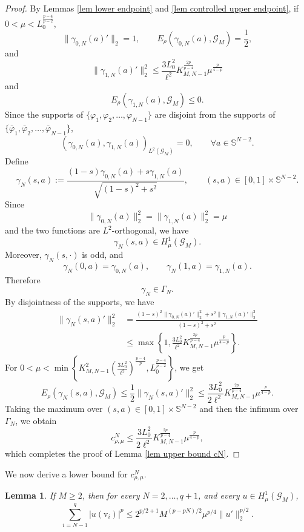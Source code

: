 \documentclass[11pt]{amsart}
\newtheorem{lemma}[theorem]{Lemma}
\newcommand{\norm}[1]{\lVert#1\rVert}
\newcommand{\G}{\mathcal{G}}
\newcommand{\vv}{\mathrm{v}}
\numberwithin{equation}{section}
\begin{document}
\begin{proof}
By Lemmas \ref{lem lower endpoint} and \ref{lem controlled upper endpoint}, if $0<\mu<L_0^{\frac{p-4}{p-2}}$,
$$
\|\gamma_{0,N}(a)'\|_2=1,
\qquad
E_\rho(\gamma_{0,N}(a),\G_M)=\frac12,
$$
and
$$
\|\gamma_{1,N}(a)'\|_2^2
\leq
\frac{3L_0^2}{\ell^2}
K^{\frac{2p}{p-4}}_{M,N-1}
\mu^\frac{p}{4-p}
$$
and
$$
E_\rho(\gamma_{1,N}(a),\G_M)\leq 0.
$$
Since the supports of $\{{\varphi}_{1},{\varphi}_{2},\ldots,{\varphi}_{N-1}\}$ are disjoint from the supports of $\{\bar{\varphi}_{1},\bar{\varphi}_{2},\ldots,\bar{\varphi}_{N-1}\}$,
$$
(\gamma_{0,N}(a),\gamma_{1,N}(a))_{L^2(\G_M)}=0,
\qquad 
\forall a\in\mathbb S^{N-2}.
$$
Define
$$
\gamma_N(s,a)
:=
\frac{(1-s)\gamma_{0,N}(a)+s\gamma_{1,N}(a)}
{\sqrt{(1-s)^2+s^2}},
\qquad
(s,a)\in[0,1]\times\mathbb S^{N-2}.
$$
Since
$$
\|\gamma_{0,N}(a)\|_2^2
=
\|\gamma_{1,N}(a)\|_2^2
=
\mu
$$
and the two functions are $L^2$-orthogonal, we have
$$
\gamma_N(s,a)\in H^1_\mu(\G_M).
$$
Moreover, $\gamma_N(s,\cdot)$ is odd, and
$$
\gamma_N(0,a)=\gamma_{0,N}(a),
\qquad
\gamma_N(1,a)=\gamma_{1,N}(a).
$$
Therefore
$$
\gamma_N\in\Gamma_N.
$$
By disjointness of the supports, we have
$$
\begin{aligned}
\|\gamma_N(s,a)'\|_2^2
&=
\frac{
(1-s)^2\|\gamma_{0,N}(a)'\|_2^2
+
s^2\|\gamma_{1,N}(a)'\|_2^2
}
{(1-s)^2+s^2}
\\
&\leq
\max\left\{
1,
\frac{3L_0^2}{\ell^2}K^{\frac{2p}{p-4}}_{M,N-1}
\mu^\frac{p}{4-p}
\right\}.
\end{aligned}
$$
For $0<\mu<\min\left\{K^{2}_{M,N-1}\left(\frac{3L_0^2}{\ell^2}\right)^\frac{p-4}{p},L_0^\frac{p-4}{p-2}\right\}$, we get
$$
E_\rho(\gamma_N(s,a),\G_M)
\leq
\frac12\|\gamma_N(s,a)'\|_2^2
\leq
\frac{3L_0^2}{2\ell^2}K^{\frac{2p}{p-4}}_{M,N-1}
\mu^\frac{p}{4-p}.
$$
Taking the maximum over $(s,a)\in[0,1]\times\mathbb S^{N-2}$ and then the
infimum over $\Gamma_N$, we obtain
$$
c_{\rho,\mu}^N
\leq
\frac{3L_0^2}{2\ell^2}K^{\frac{2p}{p-4}}_{M,N-1}
\mu^\frac{p}{4-p},
$$
which completes the proof of Lemma \ref{lem upper bound cN}.
\end{proof}
We now derive a lower bound for $c^N_{\rho,\mu}$.
\begin{lemma}\label{lem-trace-K}
If $M \geq 2$, then for every $N=2,\ldots,q+1$, and every
\(u\in H^1_\mu(\G_M)\),
\begin{equation}\label{trace-tail}
\sum_{i=N-1}^{q}|u(\vv_i)|^p\leq 2^{p/2+1}M^{(p-pN)/2}\mu^{p/4}\norm{u'}_2^{p/2}.
\end{equation}


\end{lemma}
\end{document}
